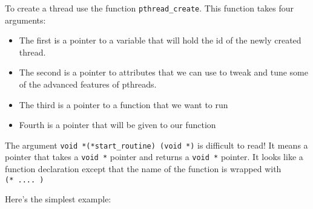 To create a thread use the function \texttt{pthread\_create}. This
function takes four arguments:

\begin{Shaded}
\begin{Highlighting}[]
  
                     \NormalTok{*), } 
\end{Highlighting}
\end{Shaded}

\begin{itemize}
\tightlist
\item
  The first is a pointer to a variable that will hold the id of the
  newly created thread.
\item
  The second is a pointer to attributes that we can use to tweak and
  tune some of the advanced features of pthreads.
\item
  The third is a pointer to a function that we want to run
\item
  Fourth is a pointer that will be given to our function
\end{itemize}

The argument \texttt{void\ *(*start\_routine)\ (void\ *)} is difficult
to read! It means a pointer that takes a \texttt{void\ *} pointer and
returns a \texttt{void\ *} pointer. It looks like a function declaration
except that the name of the function is wrapped with
\texttt{(*\ ....\ )}

Here's the simplest example:

\begin{Shaded}
\begin{Highlighting}[]

  
    \NormalTok{);}
     
\NormalTok{\}}
 
    \NormalTok{);}
     \NormalTok{(}\NormalTok{) \{\} }
\NormalTok{\}}
\end{Highlighting}
\end{Shaded}


